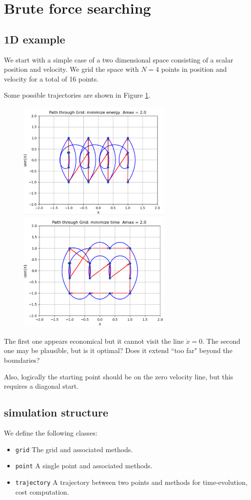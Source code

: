 \documentclass[letterpaper]{article}
\begin{document}
\section{Brute force searching}

\subsection{1D example}
We start with a simple case of a two dimensional space consisting of a scalar position and velocity.  We grid the
space with $N=4$ points in position and velocity for a total of 16 points.

Some possible trajectories are shown in Figure \ref{handsolutions1D}.


\begin{figure}\centering
  \includegraphics[width=3.0in]{handTraj01.png}
  \includegraphics[width=3.0in]{handTraj02.png}
  \caption{}\label{handsolutions1D}
\end{figure}

The first one appears economical but it cannot visit the line $\dot{x} = 0$.  The second one may be plausible,
but is it optimal?   Does it extend ``too far" beyond the boundaries?

Also, logically the starting point should be on the zero velocity line, but this requires a diagonal start.

\subsection{simulation structure}
We define the following classes:
\begin{itemize}
  \item {\tt grid}   The grid and associated methods.
  \item {\tt point}  A single point and associated methods.
  \item {\tt trajectory} A trajectory between two points and methods for time-evolution, cost computation.
\end{itemize}
\end{document}
